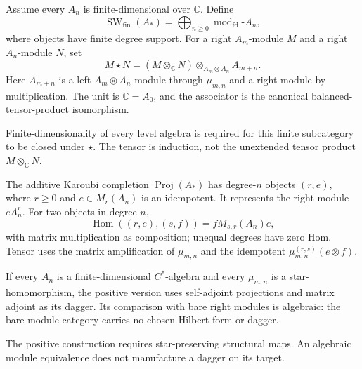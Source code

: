 \begin{definition}
Assume every $A_n$ is finite-dimensional over $\mathbb C$.  Define
\[
 \operatorname{SW}_{\mathrm{fin}}(A_*)
   =\bigoplus_{n\geq0}\operatorname{mod}_{\mathrm{fd}}\!\text{-}A_n,
\]
where objects have finite degree support.  For a right $A_m$-module $M$ and
a right $A_n$-module $N$, set
\[
 M\star N=(M\otimes_{\mathbb C}N)
   \otimes_{A_m\otimes A_n}A_{m+n}.
\]
Here $A_{m+n}$ is a left $A_m\otimes A_n$-module through $\mu_{m,n}$ and a
right module by multiplication.  The unit is $\mathbb C=A_0$, and the
associator is the canonical balanced-tensor-product isomorphism.
\end{definition}
\begin{scope}
Finite-dimensionality of every level algebra is required for this finite
subcategory to be closed under $\star$.  The tensor is induction, not the
unextended tensor product $M\otimes_{\mathbb C}N$.
\end{scope}

\begin{definition}
The additive Karoubi completion $\operatorname{Proj}(A_*)$ has degree-$n$
objects $(r,e)$, where $r\geq0$ and $e\in M_r(A_n)$ is an idempotent.  It
represents the right module $eA_n^r$.  For two objects in degree $n$,
\[
 \operatorname{Hom}((r,e),(s,f))=fM_{s,r}(A_n)e,
\]
with matrix multiplication as composition; unequal degrees have zero Hom.
Tensor uses the matrix amplification of $\mu_{m,n}$ and the idempotent
$\mu_{m,n}^{(r,s)}(e\otimes f)$.

If every $A_n$ is a finite-dimensional $C^*$-algebra and every $\mu_{m,n}$
is a star-homomorphism, the positive version uses self-adjoint projections
and matrix adjoint as its dagger.  Its comparison with bare right modules is
algebraic: the bare module category carries no chosen Hilbert form or dagger.
\end{definition}
\begin{scope}
The positive construction requires star-preserving structural maps.  An
algebraic module equivalence does not manufacture a dagger on its target.
\end{scope}

